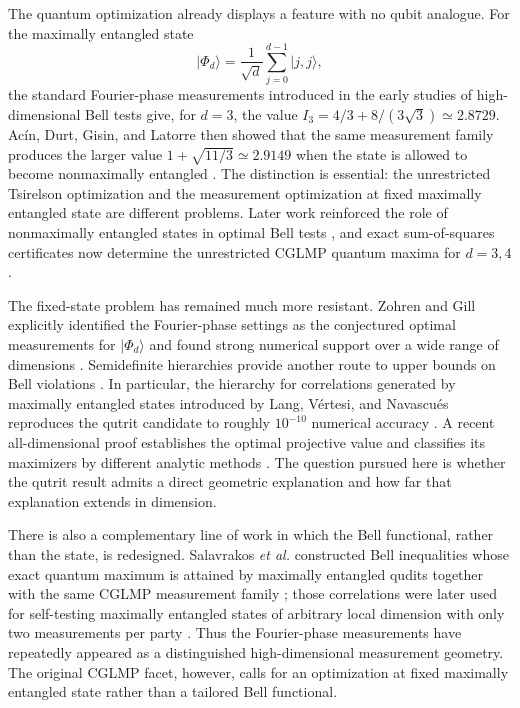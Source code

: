 \documentclass[aps,prl,reprint,superscriptaddress,nofootinbib]{revtex4-2}
\newcommand{\ket}[1]{\lvert #1\rangle}
\newcommand{\PhiD}{\lvert\Phi_d\rangle}
\begin{document}
The quantum optimization already displays a feature with no qubit analogue. For the maximally entangled state
\begin{equation}
\PhiD=\frac{1}{\sqrt d}\sum_{j=0}^{d-1}\ket{j,j},
\label{eq:mes}
\end{equation}
the standard Fourier-phase measurements introduced in the early studies of high-dimensional Bell tests \cite{Durt2001,CGLMP} give, for $d=3$, the value $I_3=4/3+8/(3\sqrt3)\simeq2.8729$. Ac\'{i}n, Durt, Gisin, and Latorre then showed that the same measurement family produces the larger value $1+\sqrt{11/3}\simeq2.9149$ when the state is allowed to become nonmaximally entangled \cite{Acin2002}. The distinction is essential: the unrestricted Tsirelson optimization and the measurement optimization at fixed maximally entangled state are different problems. Later work reinforced the role of nonmaximally entangled states in optimal Bell tests \cite{AcinGillGisin}, and exact sum-of-squares certificates now determine the unrestricted CGLMP quantum maxima for $d=3,4$ \cite{IoannouRosset}.

The fixed-state problem has remained much more resistant. Zohren and Gill explicitly identified the Fourier-phase settings as the conjectured optimal measurements for $\PhiD$ and found strong numerical support over a wide range of dimensions \cite{ZG}. Semidefinite hierarchies provide another route to upper bounds on Bell violations \cite{NPA}. In particular, the hierarchy for correlations generated by maximally entangled states introduced by Lang, V\'{e}rtesi, and Navascu\'{e}s reproduces the qutrit candidate to roughly $10^{-10}$ numerical accuracy \cite{LVN}. A recent all-dimensional proof establishes the optimal projective value and classifies its maximizers by different analytic methods \cite{TurtureanBao}. The question pursued here is whether the qutrit result admits a direct geometric explanation and how far that explanation extends in dimension.

There is also a complementary line of work in which the Bell functional, rather than the state, is redesigned. Salavrakos \textit{et al.} constructed Bell inequalities whose exact quantum maximum is attained by maximally entangled qudits together with the same CGLMP measurement family \cite{SATWAP}; those correlations were later used for self-testing maximally entangled states of arbitrary local dimension with only two measurements per party \cite{Sarkar}. Thus the Fourier-phase measurements have repeatedly appeared as a distinguished high-dimensional measurement geometry. The original CGLMP facet, however, calls for an optimization at fixed maximally entangled state rather than a tailored Bell functional.
\end{document}
